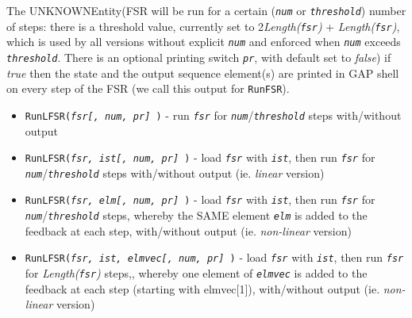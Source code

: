 \documentclass[a4paper,11pt]{report}
\begin{document}
{{{ The UNKNOWNEntity(FSR will be run for a certain (\mbox{\texttt{\mdseries\slshape num}} or \mbox{\texttt{\mdseries\slshape threshold}}) number of steps: there is a threshold value, currently set to
2\texttt{}\emph{Length(\mbox{\texttt{\mdseries\slshape fsr}})} + \emph{Length(\mbox{\texttt{\mdseries\slshape fsr}})}, which is used by all versions without explicit \mbox{\texttt{\mdseries\slshape num}} and enforced when \mbox{\texttt{\mdseries\slshape num}} exceeds \mbox{\texttt{\mdseries\slshape threshold}}. There is an optional printing switch \mbox{\texttt{\mdseries\slshape pr}}, with default set to \emph{false}) if \emph{true} then the state and the output sequence element(s) are printed in \textsf{GAP} shell on every step of the \textsf{FSR} (we call this output for \texttt{RunFSR}). 
\begin{itemize}
\item  \texttt{RunLFSR(\mbox{\texttt{\mdseries\slshape  fsr[, num, pr] }})} - run \mbox{\texttt{\mdseries\slshape fsr}} for \mbox{\texttt{\mdseries\slshape num}}/\mbox{\texttt{\mdseries\slshape threshold}} steps with/without output
\item  \texttt{RunLFSR(\mbox{\texttt{\mdseries\slshape  fsr, ist[, num, pr] }})} - load \mbox{\texttt{\mdseries\slshape fsr}} with \mbox{\texttt{\mdseries\slshape ist}}, then run \mbox{\texttt{\mdseries\slshape fsr}} for \mbox{\texttt{\mdseries\slshape num}}/\mbox{\texttt{\mdseries\slshape threshold}} steps with/without output (ie. \emph{linear} version)
\item  \texttt{RunLFSR(\mbox{\texttt{\mdseries\slshape  fsr, elm[, num, pr] }})} - load \mbox{\texttt{\mdseries\slshape fsr}} with \mbox{\texttt{\mdseries\slshape ist}}, then run \mbox{\texttt{\mdseries\slshape fsr}} for \mbox{\texttt{\mdseries\slshape num}}/\mbox{\texttt{\mdseries\slshape threshold}} steps, whereby the SAME element \mbox{\texttt{\mdseries\slshape elm}} is added to the feedback at each step, with/without output (ie. \emph{non-linear} version)
\item  \texttt{RunLFSR(\mbox{\texttt{\mdseries\slshape  fsr, ist, elmvec[, num, pr] }})} - load \mbox{\texttt{\mdseries\slshape fsr}} with \mbox{\texttt{\mdseries\slshape ist}}, then run \mbox{\texttt{\mdseries\slshape fsr}} for \emph{Length(\mbox{\texttt{\mdseries\slshape fsr}})} steps,, whereby one element of \mbox{\texttt{\mdseries\slshape elmvec}} is added to the feedback at each step (starting with elmvec[1]), with/without
output (ie. \emph{non-linear} version)
\end{itemize}
}}}
\end{document}
